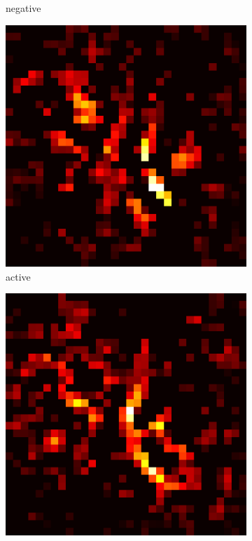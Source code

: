 \documentclass[preprint,12pt]{elsarticle}
\begin{document}
\begin{figure}
\begin{subfigure}{0.14\textwidth}
        \caption{negative}
    \end{subfigure}
    \hfill
    \begin{subfigure}{0.14\textwidth}
        \centering
        \includegraphics[width=\linewidth]{../visualizations/examples/cifar10/cnn/active_saliency_map/6.png}
        \caption{active}
    \end{subfigure}
    \hfill
    \begin{subfigure}{0.14\textwidth}
        \centering
        \includegraphics[width=\linewidth]{../visualizations/examples/cifar10/cnn/inactive_saliency_map/6.png}

\end{subfigure}
\end{figure}
\end{document}
